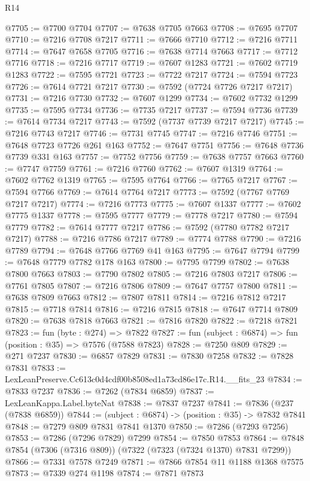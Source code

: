 \begin{lexlean}{R14}
\begin{coremodule}
@7705 := @7700 @7704
@7707 := @7638 @7705 @7663
@7708 := @7695 @7707
@7710 := @7216 @7708 @7217
@7711 := @7666 @7710
@7712 := @7216 @7711
@7714 := @7647 @7658 @7705
@7716 := @7638 @7714 @7663
@7717 := @7712 @7716
@7718 := @7216 @7717
@7719 := @7607 @1283
@7721 := @7602 @7719 @1283
@7722 := @7595 @7721
@7723 := @7722 @7217
@7724 := @7594 @7723
@7726 := @7614 @7721 @7217
@7730 := @7592 (@7724 @7726 @7217 @7217)
@7731 := @7216 @7730
@7732 := @7607 @1299
@7734 := @7602 @7732 @1299
@7735 := @7595 @7734
@7736 := @7735 @7217
@7737 := @7594 @7736
@7739 := @7614 @7734 @7217
@7743 := @7592 (@7737 @7739 @7217 @7217)
@7745 := @7216 @7743 @7217
@7746 := @7731 @7745
@7747 := @7216 @7746
@7751 := @7648 @7723 @7726 @261 @163
@7752 := @7647 @7751
@7756 := @7648 @7736 @7739 @331 @163
@7757 := @7752 @7756
@7759 := @7638 @7757 @7663
@7760 := @7747 @7759
@7761 := @7216 @7760
@7762 := @7607 @1319
@7764 := @7602 @7762 @1319
@7765 := @7595 @7764
@7766 := @7765 @7217
@7767 := @7594 @7766
@7769 := @7614 @7764 @7217
@7773 := @7592 (@7767 @7769 @7217 @7217)
@7774 := @7216 @7773
@7775 := @7607 @1337
@7777 := @7602 @7775 @1337
@7778 := @7595 @7777
@7779 := @7778 @7217
@7780 := @7594 @7779
@7782 := @7614 @7777 @7217
@7786 := @7592 (@7780 @7782 @7217 @7217)
@7788 := @7216 @7786 @7217
@7789 := @7774 @7788
@7790 := @7216 @7789
@7794 := @7648 @7766 @7769 @41 @163
@7795 := @7647 @7794
@7799 := @7648 @7779 @7782 @178 @163
@7800 := @7795 @7799
@7802 := @7638 @7800 @7663
@7803 := @7790 @7802
@7805 := @7216 @7803 @7217
@7806 := @7761 @7805
@7807 := @7216 @7806
@7809 := @7647 @7757 @7800
@7811 := @7638 @7809 @7663
@7812 := @7807 @7811
@7814 := @7216 @7812 @7217
@7815 := @7718 @7814
@7816 := @7216 @7815
@7818 := @7647 @7714 @7809
@7820 := @7638 @7818 @7663
@7821 := @7816 @7820
@7822 := @7218 @7821
@7823 := fun (byte : @274) => @7822
@7827 := fun (subject : @6874) => fun (position : @35) => @7576 (@7588 @7823)
@7828 := @7250 @809
@7829 := @271 @7237
@7830 := @6857 @7829
@7831 := @7830 @7258
@7832 := @7828 @7831
@7833 := LexLeanPreserve.Cc613c0d4cdf00b8508ed1a73cd86e17c.R14.__fits_23
@7834 := @7833 @7237
@7836 := @7262 (@7834 @6859)
@7837 := LexLeanKappa.Label.byteNat
@7838 := @7837 @7237
@7841 := @7836 (@237 (@7838 @6859))
@7844 := (subject : @6874) -> (position : @35) -> @7832 @7841
@7848 := @7279 @809 @7831 @7841 @1370
@7850 := @7286 (@7293 @7256)
@7853 := @7286 (@7296 @7829) @7299
@7854 := @7850 @7853
@7864 := @7848 @7854 (@7306 (@7316 @809)) (@7322 (@7323 (@7324 @1370) @7831 @7299))
@7866 := @7331 @7578 @7249
@7871 := @7866 @7854 @11 @1188 @1368 @7575
@7873 := @7339 @274 @1198
@7874 := @7871 @7873

\end{coremodule}
\end{lexlean}

